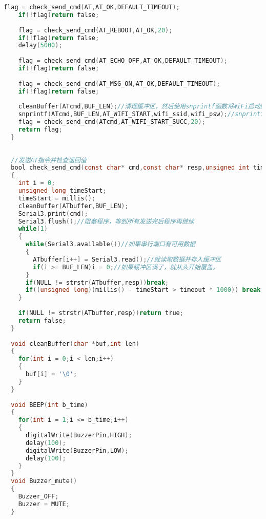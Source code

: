 \documentclass[12pt,hyperref,a4paper,UTF8]{ctexart}
\begin{document}
\begin{lstlisting}[language=C]
    flag = check_send_cmd(AT,AT_OK,DEFAULT_TIMEOUT);
    if(!flag)return false;
    
    flag = check_send_cmd(AT_REBOOT,AT_OK,20);
    if(!flag)return false;
    delay(5000);
  
    flag = check_send_cmd(AT_ECHO_OFF,AT_OK,DEFAULT_TIMEOUT);
    if(!flag)return false;
  
    flag = check_send_cmd(AT_MSG_ON,AT_OK,DEFAULT_TIMEOUT);
    if(!flag)return false;
    
    cleanBuffer(ATcmd,BUF_LEN);//清理缓冲区，然后使用snprintf函数将WiFi启动的AT命令、WiFi的SSID和密码格式化到ATcmd缓冲区。
    snprintf(ATcmd,BUF_LEN,AT_WIFI_START,wifi_ssid,wifi_psw);//snprintf是一个C语言中的函数，用于将格式化的数据写入字符串
    flag = check_send_cmd(ATcmd,AT_WIFI_START_SUCC,20);
    return flag;
  }
  
  
  //发送AT指令并检查返回值
  bool check_send_cmd(const char* cmd,const char* resp,unsigned int timeout)
  {
    int i = 0;
    unsigned long timeStart;
    timeStart = millis();
    cleanBuffer(ATbuffer,BUF_LEN);
    Serial3.print(cmd);
    Serial3.flush();//阻塞程序，等到所有发送完后程序再继续
    while(1)
    {
      while(Serial3.available())//如果串行端口有可用数据
      {
        ATbuffer[i++] = Serial3.read();//就读取数据并存入缓冲区
        if(i >= BUF_LEN)i = 0;//如果缓冲区满了，就从头开始覆盖。
      }
      if(NULL != strstr(ATbuffer,resp))break;
      if((unsigned long)(millis() - timeStart > timeout * 1000)) break;//超时
    }
    
    if(NULL != strstr(ATbuffer,resp))return true;
    return false;
  }
  
  void cleanBuffer(char *buf,int len)
  {
    for(int i = 0;i < len;i++)
    {
      buf[i] = '\0';
    } 
  }
  
  void BEEP(int b_time)
  {
    for(int i = 1;i <= b_time;i++)
    { 
      digitalWrite(BuzzerPin,HIGH);
      delay(100);
      digitalWrite(BuzzerPin,LOW);
      delay(100);
    }
  }
  void Buzzer_mute()
  {
    Buzzer_OFF;
    Buzzer = MUTE;
  }
    
\end{lstlisting}  

\end{document}
